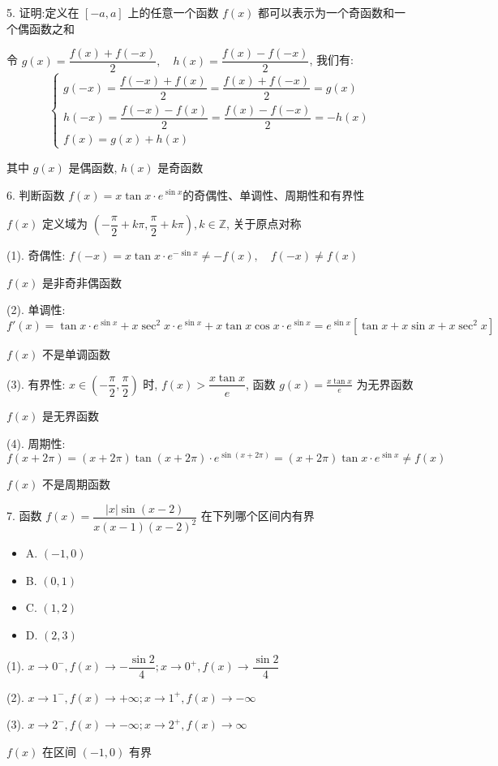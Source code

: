 5. 证明:定义在 $[-a,a]$ 上的任意一个函数 $f(x)$ 都可以表示为一个奇函数和一个偶函数之和
\begin{solution}

	令 $g(x)= \dfrac{f(x)+f(-x)}{2},\quad h(x)=\dfrac{f(x)-f(-x)}{2}$, 我们有:
	$$
	\begin{cases}
		g(-x)=\dfrac{f(-x)+f(x)}{2}=\dfrac{f(x)+f(-x)}{2}=g(x)\\
		h(-x)=\dfrac{f(-x)-f(x)}{2}=\dfrac{f(x)-f(-x)}{2}=-h(x)\\
		f(x) = g(x)+h(x)
	\end{cases}
	$$
	
	其中 $g(x)$ 是偶函数, $h(x)$ 是奇函数
\end{solution}

6. 判断函数 $f(x)=x\tan x\cdot e^{\sin x}$的奇偶性、单调性、周期性和有界性
\begin{solution}

	$f(x)$ 定义域为 $(-\dfrac{\pi}{2}+k\pi,\dfrac{\pi}{2}+k\pi),k\in \mathbb{Z}$, 关于原点对称
	
	(1). 奇偶性: $f(-x) = x\tan x\cdot e^{-\sin x}\neq -f(x),\quad f(-x)\neq f(x)$

	$f(x)$ 是非奇非偶函数

	(2). 单调性: $f'(x) = \tan x\cdot e^{\sin x}+x\sec^{2}x\cdot e^{\sin x}+x\tan x\cos x\cdot e^{\sin x}=e^{\sin x}\left[\tan x+x\sin x+x\sec^{2}x\right]$

	$f(x)$ 不是单调函数

	(3). 有界性: $x\in(-\dfrac{\pi}{2},\dfrac{\pi}{2})$ 时, $f(x) > \dfrac{x\tan x}{e}$, 函数 $g(x)=\frac{x\tan x}{e}$ 为无界函数

	$f(x)$ 是无界函数

	(4). 周期性: $f(x+2\pi) = (x+2\pi)\tan(x+2\pi)\cdot e^{\sin(x+2\pi)} = (x+2\pi)\tan x\cdot e^{\sin x} \neq f(x)$

	$f(x)$ 不是周期函数
\end{solution}

7. 函数 $f(x)=\dfrac{|x|\sin(x-2)}{x(x-1)(x-2)^{2}}$ 在下列哪个区间内有界

\begin{itemize}
	\item A. $(-1,0)$
	\item B. $(0,1)$
	\item C. $(1,2)$
	\item D. $(2,3)$
\end{itemize}
\begin{solution}

	(1). $x\to 0^{-}, f(x)\to -\dfrac{\sin 2}{4}; x\to 0^{+}, f(x)\to \dfrac{\sin 2}{4}$

	(2). $x\to 1^{-}, f(x)\to +\infty; x\to 1^{+}, f(x)\to -\infty$

	(3). $x\to 2^{-}, f(x)\to -\infty; x\to 2^{+}, f(x)\to \infty$

	$f(x)$ 在区间 $(-1,0)$ 有界
\end{solution}

